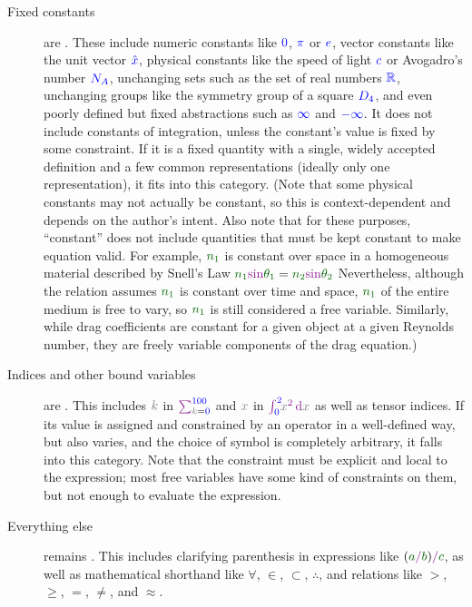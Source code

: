 \documentclass[12pt,letterpaper]{article}
\begin{document}
\begin{description}
    \item[Fixed constants] are .
      These include numeric constants like $\textcolor{blue}{0}$, $\textcolor{blue}{\pi}$ or $\textcolor{blue}{e}$,
      vector constants like the unit vector $\textcolor{blue}{\hat{x}}$,
      physical constants like the speed of light $\textcolor{blue}{c}$ or Avogadro's number $\textcolor{blue}{N_A}$,
      unchanging sets such as the set of real numbers $\textcolor{blue}{\mathbb{R}}$,
      unchanging groups like the symmetry group of a square $\textcolor{blue}{D_4}$,
      and even poorly defined but fixed abstractions such as $\textcolor{blue}{\infty}$ and $\textcolor{blue}{-\infty}$.
      It does not include constants of integration,
      unless the constant's value is fixed by some constraint.
      If it is a fixed quantity with a single,
      widely accepted definition and a few common representations (ideally only one representation),
      it fits into this category.
      (Note that some physical constants may not actually be constant,
      so this is context-dependent and depends on the author's intent.
      Also note that for these purposes,
      ``constant'' does not include quantities that must be kept constant to make equation valid.
      For example, $\fv{n_1}$ is constant over space in a homogeneous material described by Snell's Law
      $\fv{n_1} \op{\sin} \fv{\theta_1} = \fv{n_2} \op{\sin} \fv{\theta_2}$
      Nevertheless,
      although the relation assumes $\fv{n_1}$ is constant over time and space,
      $\fv{n_1}$ of the entire medium is free to vary,
      so $\fv{n_1}$ is still considered a free variable.
      Similarly,
      while drag coefficients are constant for a given object at a given Reynolds number,
      they are freely variable components of the drag equation.)
    \item[Indices and other bound variables] are .
      This includes $\bv{k}$ in
      $\op{\sum_{\bv{k} \nt{=} \fc{0}}^{\fc{100}}}$
      and $\bv{x}$ in
      $\op{\int_{\fc{0}}^{\fc{2}}} \! \bv{x}^{\op{2}} \, \op{\mathrm{d}} \bv{x}$
      as well as tensor indices.
      If its value is assigned and constrained by an operator in a well-defined way,
      but also varies,
      and the choice of symbol is completely arbitrary,
      it falls into this category.
      Note that the constraint must be explicit and local to the expression;
      most free variables have some kind of constraints on them,
      but not enough to evaluate the expression.
    \item[Everything else] remains .
      This includes clarifying parenthesis in expressions like
      $(
        \fv{a} \op{/} \fv{b}
       )\op{/}
       \fv{c}$,
      as well as mathematical shorthand like $\forall$, $\in$, $\subset$, $\therefore$, and relations like $>$, $\geq$, $=$, $\neq$, and $\approx$.
\end{description}
\end{document}
